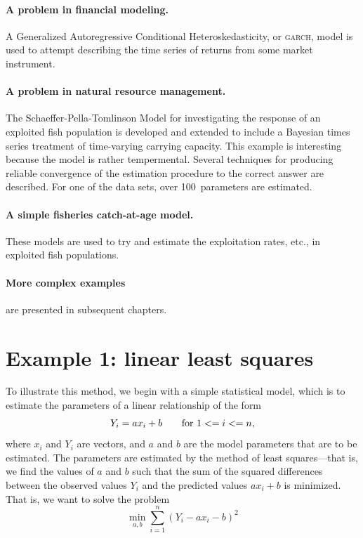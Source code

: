 \documentclass{admbmanual}
\begin{document}
\paragraph{A problem in financial modeling.} A Generalized Autoregressive 
Conditional Hetero\-ske\-dast\-icity, or \textsc{garch}, model  is used
to attempt describing the time series of returns from some
market instrument.

\paragraph{A problem in natural resource management.} The 
Schaeffer-Pella-Tomlinson Model
for investigating the response of an exploited fish population
is developed and extended to include
a Bayesian times series treatment of time-varying carrying 
capacity.  This example is interesting because the model
is rather tempermental.  Several techniques for
producing reliable convergence of the estimation procedure to
the correct answer are described. For one of the data sets, over 
100~parameters are estimated.  

\paragraph{A simple fisheries catch-at-age model.} These models
are used to try and estimate the exploitation rates, etc., in
exploited fish populations. 

\paragraph{More complex examples} are presented in subsequent chapters. 


\section{Example 1: linear least squares}

To illustrate this method, we begin with a simple statistical
model, which is to estimate the parameters of
a linear relationship of the form 
$$Y_{i} =ax_i+b\qquad \hbox{\rm for}\ 1<=i<=n,$$
where $x_i$ and $Y_i$ are vectors, and $a$ and $b$ are the model parameters
that are to be estimated. The parameters are estimated by the method
of least squares---that is, we find the values of $a$ and $b$ such that
the sum of the squared differences between the observed values
$Y_i$ and the predicted values $ax_i+b$ is minimized. That is,
we want to solve the problem
$$\min_{a,b}\sum_{i=1}^n(Y_i-ax_i-b)^2$$   
\end{document}
